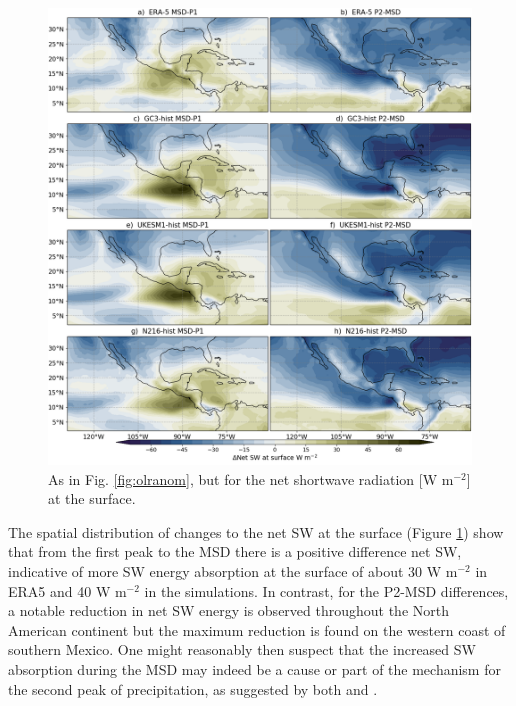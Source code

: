\begin{figure}[t!]
\includegraphics[width=\linewidth]{figures/fig4_netswdif_3.png}
\caption[Composite shortave differences with MSD timings]{As in Fig. \ref{fig:olranom}, but for the  net shortwave radiation [W m$^{-2}$] at the surface.}
\label{fig:swnet_diff}
\end{figure}

The spatial distribution of changes to the net SW at the surface (Figure \ref{fig:swnet_diff}) show that from the first peak to the MSD there is a positive difference net SW, indicative of more SW energy absorption at the surface of about 30 W m$^{-2}$ in ERA5 and 40 W m$^{-2}$ in the simulations. In contrast, for the P2-MSD differences, a notable reduction in net SW energy is observed throughout the North American continent but the maximum reduction is found on the western coast of southern Mexico. One might reasonably then suspect that the increased SW absorption during the MSD may indeed be a cause or part of the mechanism for the second peak of precipitation, as suggested by both \cite{magana1999} and \cite{karnauskas2013}. 


